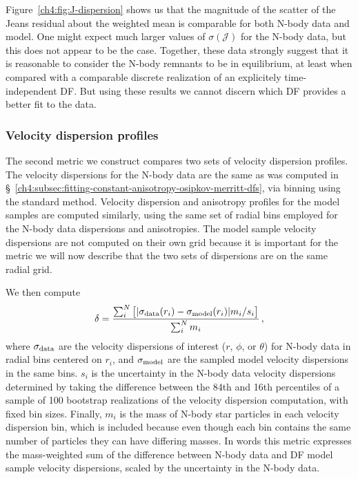 Figure~\ref{ch4:fig:J-dispersion} shows us that the magnitude of the scatter of the Jeans residual about the weighted mean is comparable for both N-body data and model. One might expect much larger values of $\sigma(\mathcal{J})$ for the N-body data, but this does not appear to be the case. Together, these data strongly suggest that it is reasonable to consider the N-body remnants to be in equilibrium, at least when compared with a comparable discrete realization of an explicitely time-independent DF. But using these results we cannot discern which DF provides a better fit to the data.

\subsubsection{Velocity dispersion profiles}
\label{ch4:subsec:velocity-dispersion-profiles}

The second metric we construct compares two sets of velocity dispersion profiles. The velocity dispersions for the N-body data are the same as was computed in \S~\ref{ch4:subsec:fitting-constant-anisotropy-osipkov-merritt-dfs}, via binning using the standard method. Velocity dispersion and anisotropy profiles for the model samples are computed similarly, using the same set of radial bins employed for the N-body data dispersions and anisotropies. The model sample velocity dispersions are not computed on their own grid because it is important for the metric we will now describe that the two sets of dispersions are on the same radial grid.

We then compute
\begin{equation}
    \label{ch4:eq:velocity-dispersion-delta}
    \delta = \frac{ \sum_{i}^{N} \big[ \lvert \sigma_{\rm data}(r_{i}) - \sigma_{\rm model}(r_{i}) \rvert m_{i} / s_{i} \big] }{ \sum_{i}^{N} m_{i} }\,,
\end{equation}
\noindent where $\sigma_{\rm data}$ are the velocity dispersions of interest ($r$, $\phi$, or $\theta$) for N-body data in radial bins centered on $r_{i}$, and $\sigma_{\rm model}$ are the sampled model velocity dispersions in the same bins. $s_{i}$ is the uncertainty in the N-body data velocity dispersions determined by taking the difference between the 84th and 16th percentiles of a sample of 100 bootstrap realizations of the velocity dispersion computation, with fixed bin sizes. Finally, $m_{i}$ is the mass of N-body star particles in each velocity dispersion bin, which is included because even though each bin contains the same number of particles they can have differing masses. In words this metric expresses the mass-weighted sum of the difference between N-body data and DF model sample velocity dispersions, scaled by the uncertainty in the N-body data.

